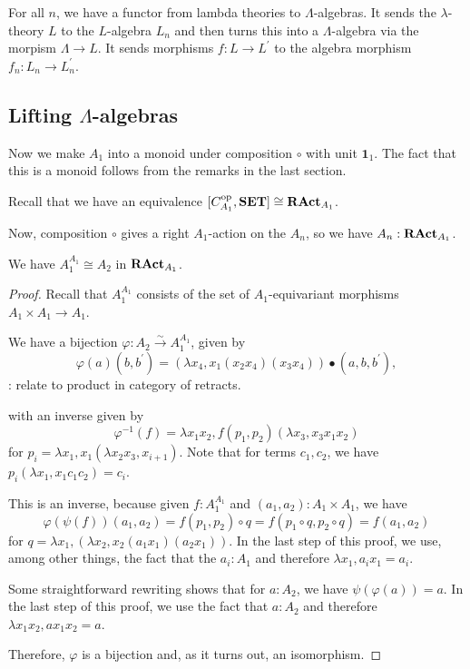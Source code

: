 \begin{definition}
  For all $ n $, we have a functor from lambda theories to $ \Lambda $-algebras. It sends the $ \lambda $-theory $ L $ to the $ L $-algebra $ L_n $ and then turns this into a $ \Lambda $-algebra via the morpism $ \Lambda \to L $. It sends morphisms $ f: L \to L^\prime $ to the algebra morphism $ f_n : L_n \to L^\prime_n $.
\end{definition}


\subsection{Lifting \texorpdfstring{$ \Lambda $}{Lambda}-algebras}

\begin{definition}
  Now we make $ A_1 $ into a monoid under composition $ \circ $ with unit $ \mathbf 1_1 $. The fact that this is a monoid follows from the remarks in the last section.
\end{definition}

Recall that we have an equivalence $ [C_{A_1}^{\text{op}}, \mathbf{SET}] \cong \mathbf{RAct}_{A_1} $.

\begin{definition}
  Now, composition $ \circ $ gives a right $ A_1 $-action on the $ A_n $, so we have $ A_n : \mathbf{RAct}_{A_1} $.
\end{definition}

\begin{lemma}
  We have $ A_1^{A_1} \cong A_2 $ in $ \mathbf{RAct}_{A_1} $.
\end{lemma}
\begin{proof}
  Recall that $ A_1^{A_1} $ consists of the set of $ A_1 $-equivariant morphisms $ A_1 \times A_1 \to A_1 $.

  We have a bijection $ \varphi: A_2 \xrightarrow{\sim} A_1^{A_1} $, given by
  \[ \varphi(a)(b, b^\prime) = (\lambda x_4, x_1 (x_2 x_4) (x_3 x_4)) \bullet (a, b, b^\prime), \]
  \TODO: relate to product in category of retracts.

  with an inverse given by
  \[ \varphi^{-1}(f) = \lambda x_1 x_2, f(p_1, p_2)(\lambda x_3, x_3 x_1 x_2) \]
  for $ p_i = \lambda x_1, x_1 (\lambda x_2 x_3, x_{i + 1}) $. Note that for terms $ c_1, c_2 $, we have $ p_i (\lambda x_1, x_1 c_1 c_2) = c_i $.

  This is an inverse, because given $ f: A_1^{A_1} $ and $ (a_1, a_2): A_1 \times A_1 $, we have
  \[ \varphi(\psi(f))(a_1, a_2) = f(p_1, p_2) \circ q = f(p_1 \circ q, p_2 \circ q) = f(a_1, a_2) \]
  for $ q = \lambda x_1, (\lambda x_2, x_2 (a_1 x_1) (a_2 x_1)) $. In the last step of this proof, we use, among other things, the fact that the $ a_i : A_1 $ and therefore $ \lambda x_1, a_i x_1 = a_i $.

  Some straightforward rewriting shows that for $ a: A_2 $, we have $ \psi(\varphi(a)) = a $. In the last step of this proof, we use the fact that $ a : A_2 $ and therefore $ \lambda x_1 x_2, a x_1 x_2 = a $.

  Therefore, $ \varphi $ is a bijection and, as it turns out, an isomorphism.
\end{proof}

